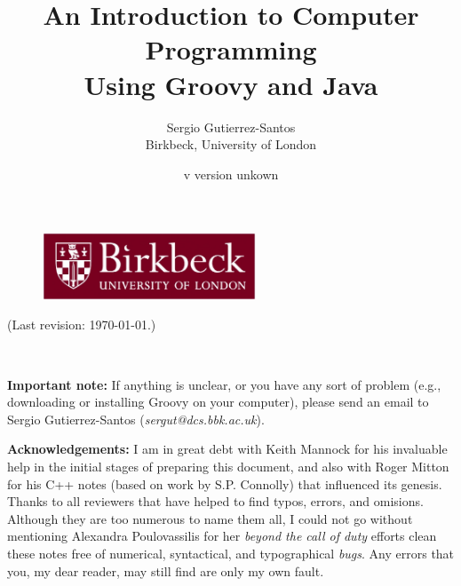 \documentclass[11pt,a4paper]{book}
\title{An Introduction to Computer Programming\\
  Using Groovy and Java} %
\author{Sergio Gutierrez-Santos\\
  Birkbeck, University of London}
\date{\InputIfFileExists{version.txt}
     {v}
     {version unkown}} %
\begin{document}

\maketitle

\thispagestyle{empty}

\vfill 

\begin{figure}[h!]  %
  \centering
  \includegraphics[height=2cm]{bbk.eps}
\end{figure}

\vfill

\noindent (Last revision: \today.)


\newpage

~\vspace{8cm}

\textbf{Important note: } If anything is unclear, or you have any 
sort of problem (e.g.,
downloading or installing Groovy on your computer), please send an
email to Sergio Gutierrez-Santos (\emph{sergut@dcs.bbk.ac.uk}).

\textbf{Acknowledgements: } I am in great debt with 
Keith Mannock for his invaluable help in the initial stages of
preparing this document, and also with Roger Mitton for his C++ notes
(based on work by S.P. Connolly) that influenced its genesis. 
Thanks to all reviewers that have helped to 
find typos, errors, and omisions. Although they are too numerous to
name them all, I could not go without mentioning Alexandra
Poulovassilis for her \emph{beyond the call of duty} efforts clean
these notes free of numerical, syntactical, and typographical
\emph{bugs}. Any errors that you, my dear reader, may still find are
only my own fault. 

\newpage

\tableofcontents
\end{document}
